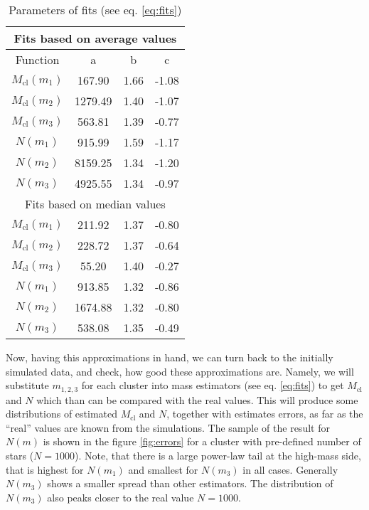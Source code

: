 \documentclass{aastex}
\newcommand{\Mcl}{M_{\mathrm{cl}}}
\begin{document}
\begin{table} 
\begin{center}
\caption{Parameters of fits (see eq. \ref{eq:fits})}\label{tbl:fits}
\begin{tabular}{cccc} \\ \toprule
\multicolumn{4}{c}{Fits based on average values} \\ \midrule
Function & a & b & c \\ \midrule
$\Mcl(m_1)$ &  167.90 & 1.66 & -1.08 \\ \midrule
$\Mcl(m_2)$ & 1279.49 & 1.40 & -1.07 \\ \midrule
$\Mcl(m_3)$ &  563.81 & 1.39 & -0.77 \\ \midrule
$N(m_1)$    &  915.99 & 1.59 & -1.17 \\ \midrule
$N(m_2)$    & 8159.25 & 1.34 & -1.20 \\ \midrule
$N(m_3)$    & 4925.55 & 1.34 & -0.97 \\ \midrule
\multicolumn{4}{c}{Fits based on median values} \\ \midrule
$\Mcl(m_1)$ &   211.92 & 1.37 & -0.80 \\ \midrule
$\Mcl(m_2)$ &   228.72 & 1.37 & -0.64 \\ \midrule
$\Mcl(m_3)$ &    55.20 & 1.40 & -0.27 \\ \midrule
$N(m_1)$    &   913.85 & 1.32 & -0.86 \\ \midrule
$N(m_2)$    &  1674.88 & 1.32 & -0.80 \\ \midrule
$N(m_3)$    &   538.08 & 1.35 & -0.49 \\ \bottomrule
\end{tabular}
\end{center}
\end{table}

Now, having this approximations in hand, we can turn back to the initially simulated data, and check, how good these approximations are. Namely, we will substitute $m_{1,2,3}$ for each cluster into mass estimators (see eq. \ref{eq:fits}) to get $\Mcl$ and $N$ which than can be compared with the real values. This will produce some distributions of estimated $\Mcl$ and $N$, together with estimates errors, as far as the ``real'' values are known from the simulations. The sample of the result for $N(m)$ is shown in the figure \ref{fig:errors} for a cluster with pre-defined number of stars ($N=1000$).
Note, that there is a large power-law tail at the high-mass side, that is highest for $N(m_1)$ and smallest for $N(m_3)$ in all cases. Generally $N(m_3)$ shows a smaller spread than other estimators. The distribution of $N(m_3)$ also peaks closer to the real value $N=1000$. 
\end{document}
